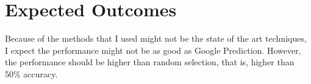 \documentclass{article}
\begin{document}
\section*{Expected Outcomes}
Because of the methods that I used might not be the state of the art techniques, I expect the performance might not be as good as Google Prediction.
However, the performance should be higher than random selection, that is, higher than 50\% accuracy.




\end{document}
